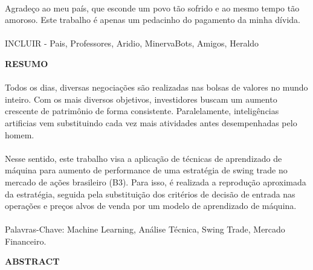 \paragraph{} Agrade\c{c}o ao meu pa\'is, que esconde um povo t\~ao sofrido e ao mesmo tempo t\~ao amoroso. Este trabalho é apenas um pedacinho do pagamento da minha d\'ivida.

\paragraph{} INCLUIR - Pais, Professores, Aridio, MinervaBots, Amigos, Heraldo

\pagebreak


\begin{center}
\textbf{RESUMO}
\end{center}
      \vspace{0.5cm}

\paragraph{} Todos os dias, diversas negociações são realizadas nas bolsas de valores no mundo inteiro. Com os mais diversos objetivos, investidores buscam um aumento crescente de patrimônio de forma consistente. Paralelamente, inteligências artificias vem substituindo cada vez mais atividades antes desempenhadas pelo homem.

\paragraph{} Nesse sentido, este trabalho visa a aplicação de técnicas de aprendizado de máquina para aumento de performance de uma estratégia de swing trade no mercado de ações brasileiro (B3). Para isso, é realizada a reprodução aproximada da estratégia, seguida pela substituição dos critérios de decisão de entrada nas operações e preços alvos de venda por um modelo de aprendizado de máquina.

\paragraph{}
\noindent Palavras-Chave: Machine Learning, Análise Técnica, Swing Trade, Mercado Financeiro.

\pagebreak


\begin{center}
\textbf{ABSTRACT}
\end{center}
      \vspace{0.5cm}

